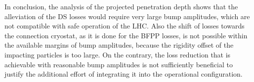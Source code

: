 In conclusion, the analysis of the projected penetration depth shows that the alleviation of the DS losses would require very large bump amplitudes, which are not compatible with safe operation of the LHC. Also the shift of losses towards the connection cryostat, as it is done for the BFPP losses, is not possible within the available margins of bump amplitudes, because the rigidity offset of the impacting particles is too large. On the contrary, the loss reduction that is achievable with reasonable bump amplitudes is not sufficiently beneficial to justify the additional effort of integrating it into the operational configuration. 









%
%
%
%

